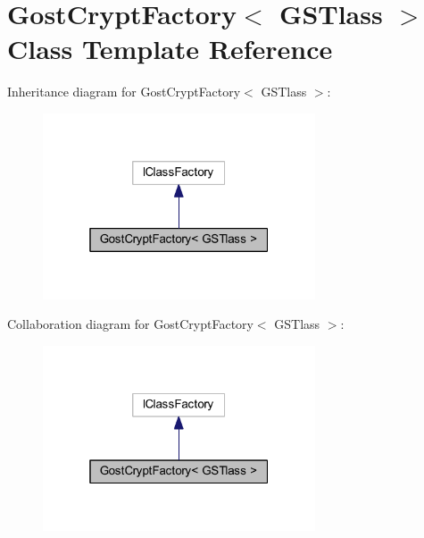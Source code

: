 \hypertarget{class_gost_crypt_factory}{}\section{Gost\+Crypt\+Factory$<$ G\+S\+Tlass $>$ Class Template Reference}
\label{class_gost_crypt_factory}


Inheritance diagram for Gost\+Crypt\+Factory$<$ G\+S\+Tlass $>$\+:
\nopagebreak
\begin{figure}[H]
\begin{center}
\leavevmode
\includegraphics[width=229pt]{class_gost_crypt_factory__inherit__graph}
\end{center}
\end{figure}


Collaboration diagram for Gost\+Crypt\+Factory$<$ G\+S\+Tlass $>$\+:
\nopagebreak
\begin{figure}[H]
\begin{center}
\leavevmode
\includegraphics[width=229pt]{class_gost_crypt_factory__coll__graph}
\end{center}
\end{figure}
